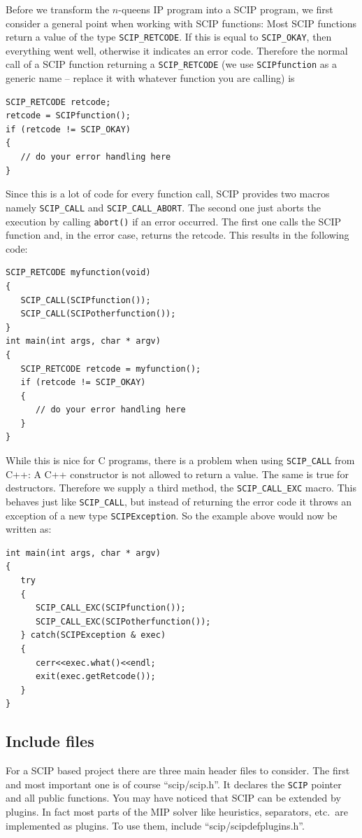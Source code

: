 \documentclass[a4paper]{article}
\begin{document}
Before we transform the $n$-queens IP program into a SCIP program, we first consider a general point when working with
SCIP functions: Most SCIP functions return a value of the type \verb+SCIP_RETCODE+. If this is equal to
\verb+SCIP_OKAY+, then everything went well, otherwise it indicates an error code. Therefore the normal call of a
SCIP function returning a \verb+SCIP_RETCODE+ (we use \verb+SCIPfunction+ as a generic name -- replace it with
whatever function you are calling) is
\begin{verbatim}
SCIP_RETCODE retcode;
retcode = SCIPfunction();
if (retcode != SCIP_OKAY)
{
   // do your error handling here
}
\end{verbatim}
Since this is a lot of code for every function call, SCIP provides two macros namely \verb+SCIP_CALL+ and
\verb+SCIP_CALL_ABORT+. The second one just aborts the execution by calling \verb+abort()+ if an error occurred.
The first one calls the SCIP function and, in the error case, returns the retcode. This results in the following code:
\begin{verbatim}
SCIP_RETCODE myfunction(void)
{
   SCIP_CALL(SCIPfunction());
   SCIP_CALL(SCIPotherfunction());
}
int main(int args, char * argv)
{
   SCIP_RETCODE retcode = myfunction();
   if (retcode != SCIP_OKAY)
   {
      // do your error handling here
   }
}
\end{verbatim}
While this is nice for C programs, there is a problem when using \verb+SCIP_CALL+ from C++: A C++ constructor is not
allowed to return a value. The same is true for destructors. Therefore we supply a third method, the
\verb+SCIP_CALL_EXC+ macro. This behaves just like \verb+SCIP_CALL+, but instead of returning the error code it
throws an exception of a new type \verb+SCIPException+. So the example above would now be written as:
\begin{verbatim}
int main(int args, char * argv)
{
   try
   {
      SCIP_CALL_EXC(SCIPfunction());
      SCIP_CALL_EXC(SCIPotherfunction());
   } catch(SCIPException & exec)
   {
      cerr<<exec.what()<<endl;
      exit(exec.getRetcode());
   }
}
\end{verbatim}

\subsection{Include files}

For a SCIP based project there are three main header files to consider. The first and most important one is of course
``scip/scip.h''. It declares the \verb+SCIP+ pointer and all public functions. You may have noticed that SCIP can be
extended by plugins.
In fact most parts of the MIP solver like heuristics, separators, etc.\ are implemented as plugins. To use them, include
``scip/scipdefplugins.h''.
\end{document}
